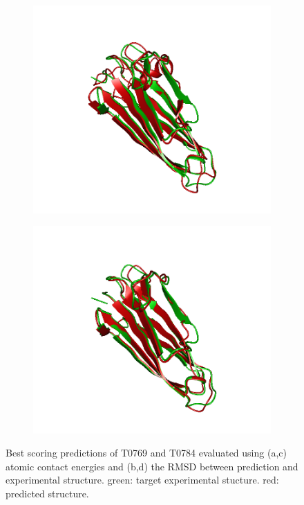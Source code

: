 \documentclass[11pt,a4paper]{article}
\begin{document}
\begin{figure}[tbp]
\begin{center}
        \begin{subfigure}{.4\textwidth}
            \includegraphics[width=\textwidth]{figures/T0784TS117}
        \end{subfigure}
        \begin{subfigure}{.4\textwidth}
            \includegraphics[width=\textwidth]{figures/T0784TS156}
        \end{subfigure}
    \end{center}
    \caption{Best scoring predictions of T0769 and T0784 evaluated using (a,c) atomic contact energies and (b,d) the RMSD between prediction and experimental structure. green: target experimental stucture. red: predicted structure.}
    \label{fig:visualize}
\end{figure}
\end{document}
